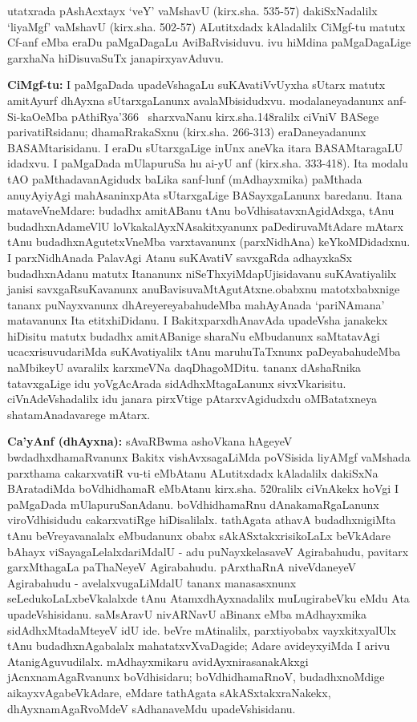 utatxrada pAshAcxtayx `veY' vaMshavU (kirx.sha. 535-57) dakiSxNadalilx `liyaMgf' vaMshavU (kirx.sha. 502-57) ALutitxdadx kAladalilx CiMgf-tu matutx Cf-anf eMba eraDu paMgaDagaLu AviBaRvisiduvu. ivu hiMdina paMgaDagaLige garxhaNa hiDisuvaSuTx janapirxyavAduvu.

{\bf CiMgf-tu:} I paMgaDada upadeVshagaLu suKAvatiVvUyxha sUtarx matutx ami\break\-tAyurf dhAyxna sUtarxgaLanunx avalaMbisidudxvu. modalaneyadanunx anf-Si-kaO\break eMba pAthiRya\char'366~ sharxvaNanu kirx.sha.148ralilx ciVniV BASege parivatiRsidanu; dhamaR\-rakaSxnu (kirx.sha. 266-313) eraDaneyadanunx BASAMtarisidanu. I eraDu sUtarx\-gaLige inUnx aneVka itara BASAMtaragaLU idadxvu. I paMgaDada mUlapuruSa hu ai-yU anf (kirx.sha. 333-418). Ita modalu tAO paMthadavanAgidudx \hbox{baLika} sanf-lunf (mAdhayxmika) paMthada anuyAyiyAgi mahAsaninxpAta sUtarx\-gaLige BASayxgaLanunx baredanu. Itana mataveVneMdare: budadhx amitABanu tAnu boVdhi\-satavxnAgidAdxga, tAnu budadhxnAdameVlU loVkakalAyxNAsakitxyanunx paDediruvaMtAdare mAtarx tAnu budadhxnAgutetxVneMba varxtavanunx (parxNidhAna) keYkoMDidadxnu. I parxNi\-dhAnada PalavAgi Atanu suKAvatiV savxgaRda adhayxkaSx budadhxnAdanu matutx Itananunx niSeThxyiMda\break pUjisi\-davanu suKAvatiyalilx janisi savxgaRsuKavanunx anuBavisuvaMtAgutAtxne.\break \hbox{obabxnu} matotxbabxnige tananx puNayxvanunx dhAreyereyabahudeMba mahAyAnada `pari\-NAmana' matavanunx Ita etitxhiDidanu. I BakitxparxdhAnavAda upadeVsha janakekx hiDi\-situ matutx budadhx amitABanige sharaNu eMbudanunx saMtatavAgi ucacxrisuvudariMda suKAvatiyalilx tAnu maruhuTaTxnunx paDeyabahudeMba naMbikeyU avaralilx karxmeVNa daqDhagoMDitu. tananx dAshaRnika tatavxgaLige idu yoVgAcArada sidAdhxMtagaLanunx sivxVkarisitu. ciVnAdeVshadalilx idu janara pirxVtige pAtarxvAgidudxdu oMBatatxneya shatamAnadavarege mAtarx.

{\bf Ca'yAnf (dhAyxna):} sAvaRBwma ashoVkana hAgeyeV bwdadhxdhamaRvanunx Bakitx vishAvxsagaLiMda poVSisida liyAMgf vaMshada parxthama cakarxvatiR vu-ti eMbAtanu ALutitxdadx kAladalilx dakiSxNa BAratadiMda boVdhidhamaR eMbAtanu kirx.sha. 520ralilx ciVnAkekx hoVgi I paMgaDada mUlapuruSanAdanu. boVdhidhamaRnu dAnakamaRgaLanunx viroVdhisidudu cakarxvatiRge hiDisalilalx. tathAgata athavA budadhxnigiMta tAnu beVreyavanalalx eMbudanunx obabx sAkASxtakxrisikoLaLx beVkAdare bAhayx viSayagaLelalxdariMdalU - adu puNayxkelasaveV Agirabahudu, pavitarx garxMthagaLa paThaNeyeV Agirabahudu. pArxthaRnA niveVdaneyeV Agirabahudu - avelalxvugaLiMdalU tananx manasasxnunx seLedukoLaLxbeVkalalxde tAnu AtamxdhAyxnadalilx muLugirabeVku eMdu Ata upadeVshisidanu. saMsAravU nivARNavU aBinanx eMba mAdhayxmika sidAdhxMtadaMteyeV idU ide. beVre mAtinalilx, parxtiyobabx vayxkitxyalUlx tAnu budadhxnAgabalalx mahatatxvXvaDagide; Adare avideyxyiMda I arivu AtanigAguvudilalx. mAdhayxmikaru avidAyxnirasanakAkxgi jAcnxnamAgaRvanunx boVdhisidaru; boVdhidhamaRnoV, budadhxnoMdige aikayxvAgabeVkAdare, eMdare tathAgata sAkASxtakxraNakekx, dhAyxnamAgaRvoMdeV sAdhanaveMdu upadeVshisidanu.

